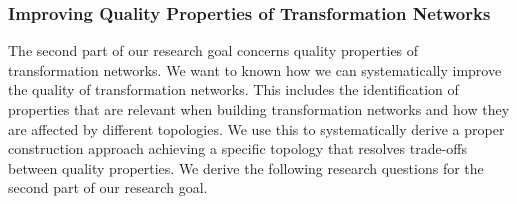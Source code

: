 


\subsubsection*{Improving Quality Properties of Transformation Networks}

The second part of our research goal concerns quality properties of transformation networks.
We want to known how we can systematically improve the quality of transformation networks. 
This includes the identification of properties that are relevant when building transformation networks and how they are affected by different topologies. 
We use this to systematically derive a proper construction approach achieving a specific topology that resolves trade-offs between quality properties. 
We derive the following research questions for the second part of our research goal.

\begin{researchquestions}
    \begin{subresearchquestions}
	\end{subresearchquestions}
\end{researchquestions}

